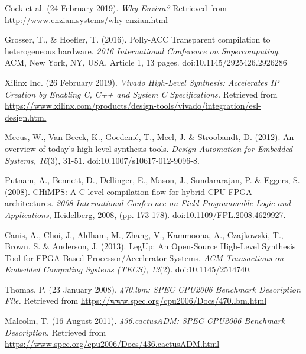 \documentclass[10pt]{article}
\begin{document}
\begin{thebibliography}{3}
Cock et al. (24 February 2019). \textit{Why Enzian?}
Retrieved from \url{http://www.enzian.systems/why-enzian.html}

Grosser, T., \& Hoefler, T. (2016). Polly-ACC Transparent compilation to heterogeneous hardware. \textit{2016 International Conference on Supercomputing}, ACM, New York, NY, USA, Article 1, 13 pages. doi:10.1145/2925426.2926286

Xilinx Inc. (26 February 2019). \textit{Vivado High-Level Synthesis: Accelerates IP Creation by Enabling C, C++ and System C Specifications.}
Retrieved from \url{https://www.xilinx.com/products/design-tools/vivado/integration/esl-design.html}

Meeus, W., Van Beeck, K., Goedem{\'e}, T., Meel, J. \& Stroobandt, D. (2012). An overview of today's high-level synthesis tools. \textit{Design Automation for Embedded Systems, 16}(3), 31-51. doi:10.1007/s10617-012-9096-8.

Putnam, A., Bennett, D., Dellinger, E., Mason, J., Sundararajan, P. \& Eggers, S. (2008). CHiMPS: A C-level compilation flow for hybrid CPU-FPGA architectures. \textit{2008 International Conference on Field Programmable Logic and Applications}, Heidelberg, 2008, (pp. 173-178). doi:10.1109/FPL.2008.4629927. 

Canis, A., Choi, J., Aldham, M., Zhang, V., Kammoona, A., Czajkowski, T., Brown, S. \& Anderson, J. (2013). LegUp: An Open-Source High-Level Synthesis Tool for FPGA-Based Processor/Accelerator Systems. \textit{ACM Transactions on Embedded Computing Systems (TECS), 13}(2). doi:10.1145/2514740. 

Thomas, P. (23 January 2008). \textit{470.lbm: SPEC CPU2006 Benchmark Description File.}
Retrieved from \url{https://www.spec.org/cpu2006/Docs/470.lbm.html}

Malcolm, T. (16 August 2011). \textit{436.cactusADM: SPEC CPU2006 Benchmark Description.}
Retrieved from \url{https://www.spec.org/cpu2006/Docs/436.cactusADM.html}

\end{thebibliography}

\newpage
\end{document}
